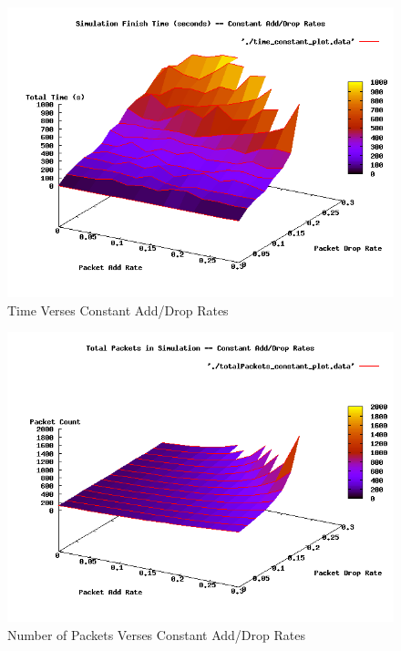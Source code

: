 \documentclass{article}
\begin{document}
\begin{figure}
	\centering
		\includegraphics[scale=0.5]{./plots/time_constant_plot.png}
	\caption{Time Verses Constant Add/Drop Rates}
	\label{fig:timeplot}
\end{figure}
\begin{figure}
	\centering
		\includegraphics[scale=0.5]{./plots/totalPackets_constant_plot.png}
	\caption{Number of Packets Verses Constant Add/Drop Rates}
	\label{fig:countplot}
\end{figure}
\end{document}
